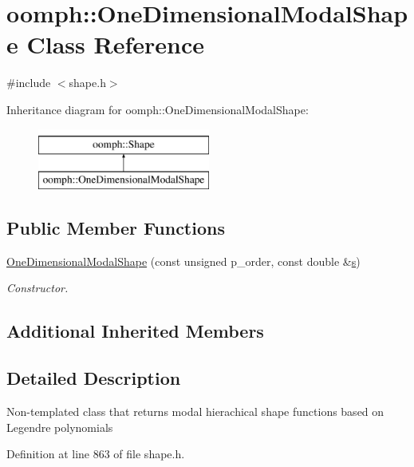 \hypertarget{classoomph_1_1OneDimensionalModalShape}{}\section{oomph\+:\+:One\+Dimensional\+Modal\+Shape Class Reference}
\label{classoomph_1_1OneDimensionalModalShape}


{\ttfamily \#include $<$shape.\+h$>$}

Inheritance diagram for oomph\+:\+:One\+Dimensional\+Modal\+Shape\+:\begin{figure}[H]
\begin{center}
\leavevmode
\includegraphics[height=2.000000cm]{classoomph_1_1OneDimensionalModalShape}
\end{center}
\end{figure}
\subsection*{Public Member Functions}
\begin{DoxyCompactItemize}
\item 
\hyperlink{classoomph_1_1OneDimensionalModalShape_ad0c78c7f241de32135be0b126a3e6a16}{One\+Dimensional\+Modal\+Shape} (const unsigned p\+\_\+order, const double \&\hyperlink{cfortran_8h_ab7123126e4885ef647dd9c6e3807a21c}{s})
\begin{DoxyCompactList}\small\item\em Constructor. \end{DoxyCompactList}\end{DoxyCompactItemize}
\subsection*{Additional Inherited Members}


\subsection{Detailed Description}
Non-\/templated class that returns modal hierachical shape functions based on Legendre polynomials 

Definition at line 863 of file shape.\+h.



